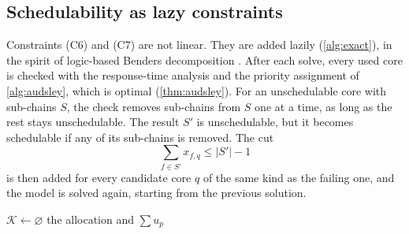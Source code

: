 \subsection{Schedulability as lazy constraints}

Constraints (C6) and (C7) are not linear. They are added lazily
(\cref{alg:exact}), in the spirit of logic-based Benders decomposition
\cite{cambazard2004decomposition}. After each solve, every used core is
checked with the response-time analysis and the priority assignment of
\cref{alg:audsley}, which is optimal (\cref{thm:audsley}). For an
unschedulable core with sub-chains $S$, the check removes sub-chains from
$S$ one at a time, as long as the rest stays unschedulable. The result $S'$
is unschedulable, but it becomes schedulable if any of its sub-chains is
removed. The cut
\begin{equation}
\textstyle\sum_{f\in S'}x_{f,q}\le|S'|-1
\label{eq:cut}
\end{equation}
is then added for every candidate core $q$ of the same kind as the failing
one, and the model is solved again, starting from the previous solution.

\begin{algorithm2e}[t]
\caption{\textsf{Exact}$(\Frags)$}
\label{alg:exact}
$\mathcal{K}\gets\varnothing$ 
\Return the allocation and $\sum u_p$\;
\end{algorithm2e}

